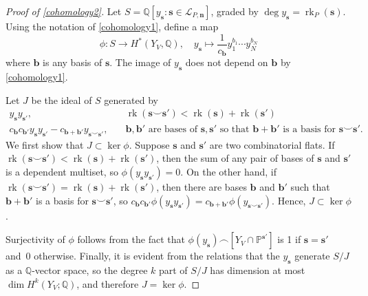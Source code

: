 \documentclass[11pt]{article}
\theoremstyle{definition}
\numberwithin{equation}{section}
\renewcommand{\P}{\mathbb{P}}
\newcommand{\Q}{\mathbb{Q}}
\DeclareMathOperator{\rk}{rk}
\begin{document}
\begin{proof}[Proof of \cref{cohomology2}]
  Let $S = \Q[y_{\mathbf s} : \text{$\mathbf s \in \mathcal L_{P, \mathbf n}$}]$, graded by $\deg y_{\mathbf s} = \rk_P(\mathbf s)$.
  Using the notation of \cref{cohomology1}, define a map
  \[
    \phi: S \to H^*(Y_V, \Q), \quad y_{\mathbf s} \mapsto \frac{1}{c_{\mathbf b}} y_1^{b_1} \cdots y_N^{b_N}
  \]
  where $\mathbf b$ is any basis of $\mathbf s$. The image of $y_{\mathbf s}$ does not depend on $\mathbf b$ by \cref{cohomology1}.

  Let $J$ be the ideal of $S$ generated by
  \begin{align*}
    y_{\mathbf s} y_{\mathbf s'}, &\quad \rk(\mathbf s \smile \mathbf s') < \rk(\mathbf s) + \rk(\mathbf s') \\
    c_{\mathbf b} c_{\mathbf b'} y_{\mathbf s} y_{\mathbf s'} - c_{\mathbf b + \mathbf b'} y_{\mathbf s \smile \mathbf s'}, & \quad \text{$\mathbf b, \mathbf b'$ are bases of $\mathbf s, \mathbf s'$ so that $\mathbf b + \mathbf b'$ is a basis for $\mathbf s \smile \mathbf s'$.}
  \end{align*}
  We first show that $J \subset \ker \phi$. Suppose $\mathbf s$ and $\mathbf s'$ are two combinatorial flats.
  If \mbox{$\rk(\mathbf{s}\smile\mathbf{s}') < \rk(\mathbf s) + \rk(\mathbf s')$}, then the sum of any pair of bases of $\mathbf s$ and $\mathbf s'$ is a dependent multiset, so $\phi(y_{\mathbf s} y_{\mathbf s'}) = 0$.
  On the other hand, if $\rk(\mathbf s \smile \mathbf s') = \rk(\mathbf s) + \rk(\mathbf s')$, then there are bases $\mathbf b$ and $\mathbf b'$ such that $\mathbf b + \mathbf b'$ is a basis for $\mathbf s \smile \mathbf s'$, so $c_{\mathbf b} c_{\mathbf b'} \phi(y_{\mathbf s} y_{\mathbf s'}) = c_{\mathbf b + \mathbf b'} \phi(y_{\mathbf s \smile \mathbf s'})$.
  Hence, $J \subset\ker \phi$.

  Surjectivity of $\phi$ follows from the fact that $\phi(y_{\mathbf s}) \smallfrown [Y_V \cap \P^{\mathbf s'}]$ is 1 if $\mathbf s = \mathbf s'$ and~0 otherwise. Finally, it is evident from the relations that the $y_{\mathbf{s}}$ generate $S/J$ as a $\mathbb{Q}$-vector space, so the degree $k$ part of $S/J$ has dimension at most $\dim H^k(Y_V; \Q)$, and therefore $J =\ker \phi$.
\end{proof}
\end{document}
